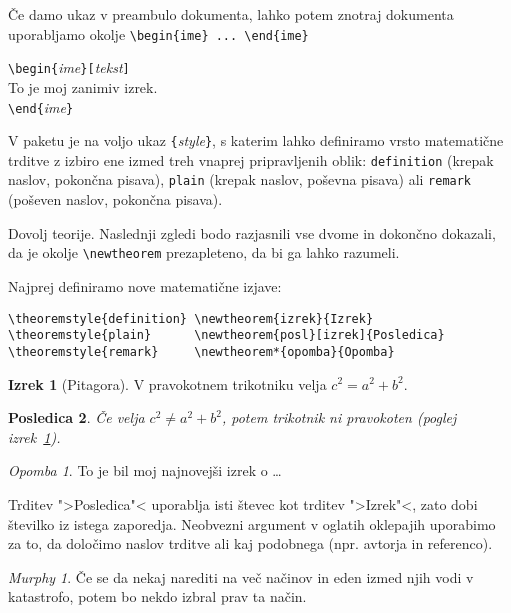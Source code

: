Če damo ukaz  v preambulo dokumenta, lahko potem 
znotraj dokumenta uporabljamo okolje
\verb|\begin{ime} ... \end{ime}|
\begin{code}
\verb|\begin{|\emph{ime}\verb|}[|\emph{tekst}\verb|]|\\
To je moj zanimiv izrek.\\
\verb|\end{|\emph{ime}\verb|}|     
\end{code}

V paketu  je na voljo ukaz \verb|{|\emph{style}\verb|}|,
s katerim lahko definiramo vrsto matematične trditve z izbiro
ene izmed treh vnaprej pripravljenih oblik: \texttt{definition} (krepak naslov, 
pokončna pisava),
\texttt{plain} (krepak naslov, poševna pisava) ali 
\texttt{remark} (poševen naslov, pokončna pisava).

Dovolj teorije. Naslednji zgledi bodo razjasnili vse dvome 
in dokončno dokazali, da je okolje \verb|\newtheorem|
prezapleteno, da bi ga lahko razumeli.

\theoremstyle{definition} \newtheorem{izrek}{Izrek}
\theoremstyle{plain}      \newtheorem{posl}[izrek]{Posledica}
\theoremstyle{remark}     \newtheorem*{opomba}{Opomba}

Najprej definiramo nove matematične izjave:

\begin{verbatim}
\theoremstyle{definition} \newtheorem{izrek}{Izrek}
\theoremstyle{plain}      \newtheorem{posl}[izrek]{Posledica}
\theoremstyle{remark}     \newtheorem*{opomba}{Opomba}
\end{verbatim}

\begin{example}
\begin{izrek}[Pitagora] 
\label{izrek:Pit}
V pravokotnem trikotniku velja 
$c^2=a^2+b^2$.
\end{izrek}
\begin{posl}
Če velja $c^2\ne a^2+b^2$, potem 
trikotnik ni pravokoten
(poglej izrek~\ref{izrek:Pit}).
\end{posl}
\begin{opomba}To je bil moj 
najnovejši izrek o \ldots
\end{opomba}
\end{example}

Trditev ">Posledica"< uporablja isti števec kot trditev ">Izrek"<,
zato dobi številko iz istega zaporedja. 
Neobvezni argument v oglatih oklepajih uporabimo za to, da določimo naslov trditve ali
kaj podobnega (npr. avtorja in referenco).
\begin{example}
\flushleft
\newtheorem{mur}{Murphy}[section]
\begin{mur}
Če se da nekaj narediti na več
načinov in eden izmed njih vodi
v katastrofo, potem bo nekdo 
izbral prav ta način.
\end{mur}
\end{example}

